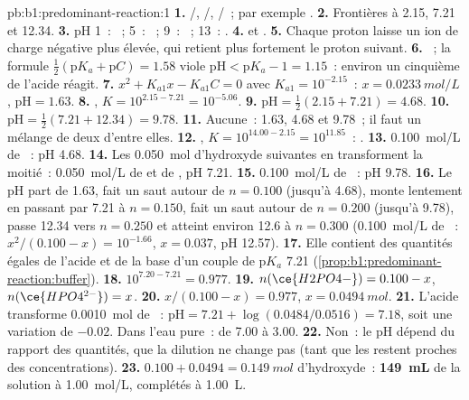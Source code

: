 \begin{solution}{pb:b1:predominant-reaction:1}
\textbf{1.} /, /,
/~; par exemple .
\textbf{2.} Frontières à 2.15, 7.21 et 12.34.
\textbf{3.} pH 1~: ~; 5~: ~; 9~: ~; 13~:
.
\textbf{4.}  et .
\textbf{5.} Chaque proton laisse un ion de charge négative plus élevée,
qui retient plus fortement le proton suivant.
\textbf{6.} ~; la formule
$\frac12(\mathrm{p}K_a + \mathrm{p}C) = 1.58$ viole $\mathrm{pH} <
\mathrm{p}K_a - 1 = 1.15$~: environ un cinquième de l'acide réagit.
\textbf{7.} $x^2 + K_{a1}x - K_{a1}C = 0$ avec $K_{a1} = 10^{-2.15}$~: $x =
\qty{0.0233}{mol/L}$, $\mathrm{pH} = 1.63$.
\textbf{8.} , $K = 10^{2.15 - 7.21} =
10^{-5.06}$.
\textbf{9.} $\mathrm{pH} = \frac12(2.15 + 7.21) = 4.68$.
\textbf{10.} $\mathrm{pH} = \frac12(7.21 + 12.34) = 9.78$.
\textbf{11.} Aucune~: 1.63, 4.68 et 9.78~; il faut un mélange de deux
d'entre elles.
\textbf{12.} , $K = 10^{14.00 - 2.15} =
10^{11.85}$~: .
\textbf{13.} \qty{0.100}{mol/L} de ~: pH 4.68.
\textbf{14.} Les \qty{0.050}{mol} d'hydroxyde suivantes en transforment
la moitié~: \qty{0.050}{mol/L} de  et de , pH 7.21.
\textbf{15.} \qty{0.100}{mol/L} de ~: pH 9.78.
\textbf{16.} Le pH part de 1.63, fait un saut autour de $n = 0.100$
(jusqu'à 4.68), monte lentement en passant par 7.21 à $n = 0.150$, fait
un saut autour de $n = 0.200$ (jusqu'à 9.78), passe 12.34 vers
$n = 0.250$ et atteint environ 12.6 à $n = 0.300$ (\qty{0.100}{mol/L}
de ~: $x^2/(0.100 - x) = 10^{-1.66}$, $x = 0.037$, pH 12.57).
\textbf{17.} Elle contient des quantités égales de l'acide et de la base
d'un couple de $\mathrm{p}K_a$ 7.21 (\cref{prop:b1:predominant-reaction:buffer}).
\textbf{18.} $10^{7.20 - 7.21} = 0.977$.
\textbf{19.} $n(\ce{H2PO4-}) = 0.100 - x$, $n(\ce{HPO4^{2-}}) = x$.
\textbf{20.} $x/(0.100 - x) = 0.977$, $x = \qty{0.0494}{mol}$.
\textbf{21.} L'acide transforme \qty{0.0010}{mol} de ~:
$\mathrm{pH} = 7.21 + \log(0.0484/0.0516) = 7.18$, soit une variation de
$-0.02$. Dans l'eau pure~: de 7.00 à 3.00.
\textbf{22.} Non~: le pH dépend du rapport des quantités, que la
dilution ne change pas (tant que les  restent proches des
concentrations).
\textbf{23.} $0.100 + 0.0494 = \qty{0.149}{mol}$ d'hydroxyde~:
\textbf{\qty{149}{mL}} de la solution à \qty{1.00}{mol/L}, complétés à
\qty{1.00}{L}.
\end{solution}
